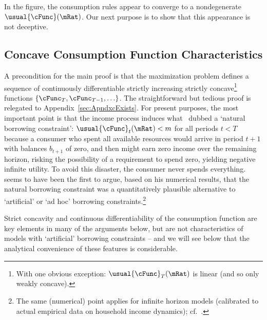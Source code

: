 \documentclass[ProjectDLO]{subfiles}
\begin{document}
\hypertarget{\figFile}{}
\hypertarget{\figName}{}

In the figure, the consumption rules appear to converge to a nondegenerate $\usual{\cFunc}(\mRat)$.
Our next purpose is to show that this appearance is not deceptive.  \hypertarget{Concave-Consumption-Function-Characteristics}{}

\subsection{Concave Consumption Function Characteristics}\label{sec:cExists}

A precondition for the main proof is that the maximization problem defines a sequence of continuously differentiable strictly increasing strictly concave\footnote{With one obvious exception: $\usual{\cFunc}_{T}(\mRat)$ is linear (and so only weakly concave).} functions $\{\cFunc_{T},\cFunc_{T-1},\ldots\}$.  The straightforward but tedious proof is relegated to Appendix~\ref{sec:ApndxcExists}.  For present purposes, the most important point is that the income process induces what~\cite{aiyagari:ge} dubbed a `natural borrowing constraint':  $\usual{\cFunc}_{t}(\mRat) < m$ for all periods $t < T$ because a consumer who spent all available resources would arrive in period $t+1$ with balances $b_{t+1}$ of zero, and then might earn zero income over the remaining horizon, risking the possibility of a requirement to spend zero, yielding negative infinite utility.  To avoid this disaster, the consumer never spends everything.~~\cite{zeldesStochastic} seems to have been the first to argue, based on his numerical results, that the natural borrowing constraint was a quantitatively plausible alternative to `artificial' or `ad hoc' borrowing constraints.\footnote{The same (numerical) point applies for infinite horizon models (calibrated to actual empirical data on household income dynamics); cf.~\cite{carrollBrookings}.}

Strict concavity and continuous differentiability of the consumption function are key elements in many of the arguments below, but are not characteristics of models with `artificial' borrowing constraints -- and we will see below that the analytical convenience of these features is considerable.%
\end{document}
